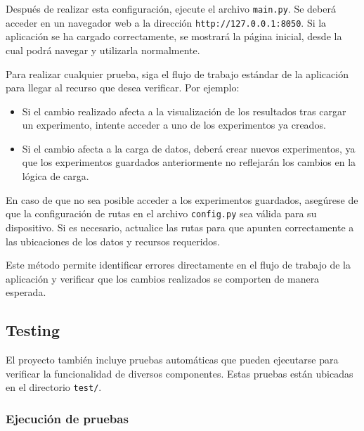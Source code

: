 Después de realizar esta configuración, ejecute el archivo \texttt{main.py}. Se deberá acceder en un navegador web a la dirección \texttt{http://127.0.0.1:8050}. Si la aplicación se ha cargado correctamente, se mostrará la página inicial, desde la cual podrá navegar y utilizarla normalmente.

Para realizar cualquier prueba, siga el flujo de trabajo estándar de la aplicación para llegar al recurso que desea verificar. Por ejemplo:
\begin{itemize}
    \item Si el cambio realizado afecta a la visualización de los resultados tras cargar un experimento, intente acceder a uno de los experimentos ya creados. 
    \item Si el cambio afecta a la carga de datos, deberá crear nuevos experimentos, ya que los experimentos guardados anteriormente no reflejarán los cambios en la lógica de carga.
\end{itemize}

En caso de que no sea posible acceder a los experimentos guardados, asegúrese de que la configuración de rutas en el archivo \texttt{config.py} sea válida para su dispositivo. Si es necesario, actualice las rutas para que apunten correctamente a las ubicaciones de los datos y recursos requeridos.

Este método permite identificar errores directamente en el flujo de trabajo de la aplicación y verificar que los cambios realizados se comporten de manera esperada.

\subsection{Testing}

El proyecto también incluye pruebas automáticas que pueden ejecutarse para verificar la funcionalidad de diversos componentes. Estas pruebas están ubicadas en el directorio \texttt{test/}.

\subsubsection{Ejecución de pruebas}

